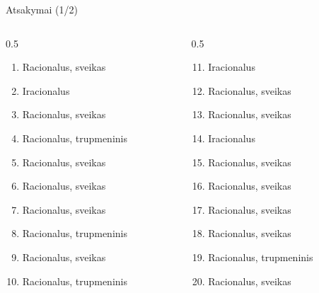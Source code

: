 \documentclass[aspectratio=169, 10pt]{beamer}
\begin{document}
\begin{frame}{Atsakymai (1/2)}
    \begin{columns}[T]
        \begin{column}{0.5\textwidth}
            \small
            \begin{enumerate}
                \item Racionalus, sveikas
                \item Iracionalus
                \item Racionalus, sveikas
                \item Racionalus, trupmeninis
                \item Racionalus, sveikas
                \item Racionalus, sveikas
                \item Racionalus, sveikas
                \item Racionalus, trupmeninis
                \item Racionalus, sveikas
                \item Racionalus, trupmeninis
            \end{enumerate}
        \end{column}
        
        \begin{column}{0.5\textwidth}
            \small
            \begin{enumerate}
                \setcounter{enumi}{10}
                \item Iracionalus
                \item Racionalus, sveikas
                \item Racionalus, sveikas
                \item Iracionalus
                \item Racionalus, sveikas
                \item Racionalus, sveikas
                \item Racionalus, sveikas
                \item Racionalus, sveikas
                \item Racionalus, trupmeninis
                \item Racionalus, sveikas
            \end{enumerate}
        \end{column}
    \end{columns}
\end{frame}
\end{document}
